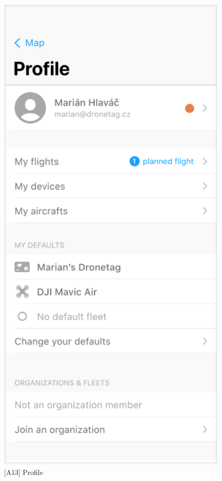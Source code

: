 \begin{figure}
\begin{minipage}{.45\textwidth}
        \includegraphics[width=.7\linewidth]{assets/user_interface_design/profile/profile.png}
        \caption{[A13] Profile}
        \label{fig:profile}
    \end{minipage}
    \label{fig:profile_all}
\end{figure}
